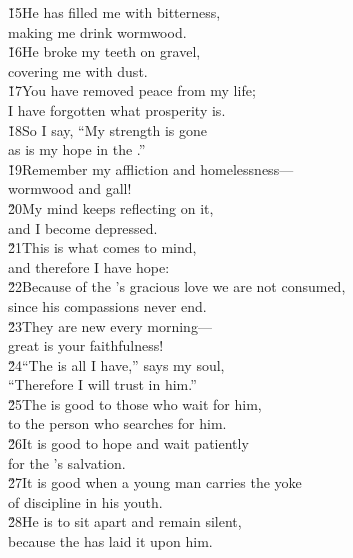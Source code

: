 \begin{poetry}
\poeml \v{15}He has filled me with bitterness, \\
\poemll    making me drink wormwood. \\
\poeml \v{16}He broke my teeth on gravel, \\
\poemll    covering me with dust. \\
\poeml \v{17}You have removed peace from my life; \\
\poemll    I have forgotten what prosperity is. \\
\poeml \v{18}So I say, ``My strength is gone \\
\poemll    as is my hope in the .'' \\
\poeml \v{19}Remember my affliction and homelessness--- \\
\poemll    wormwood and gall! \\
\poeml \v{20}My mind keeps reflecting on it, \\
\poemll    and I become depressed. \\
\poeml \v{21}This is what comes to mind, \\
\poemll    and therefore I have hope: \\
\poeml \v{22}Because of the 's gracious love we are not consumed, \\
\poemll    since his compassions never end. \\
\poeml \v{23}They are new every morning--- \\
\poemll    great is your faithfulness! \\
\poeml \v{24}``The  is all I have,'' says my soul, \\
\poemll    ``Therefore I will trust in him.'' \\
\poeml \v{25}The  is good to those who wait for him, \\
\poemll    to the person who searches for him. \\
\poeml \v{26}It is good to hope and wait patiently \\
\poemll    for the 's salvation. \\
\poeml \v{27}It is good when a young man carries the yoke \\
\poemll    of discipline in his youth. \\
\poeml \v{28}He is to sit apart and remain silent, \\
\poemll    because the  has laid it upon him. \\

\end{poetry}
